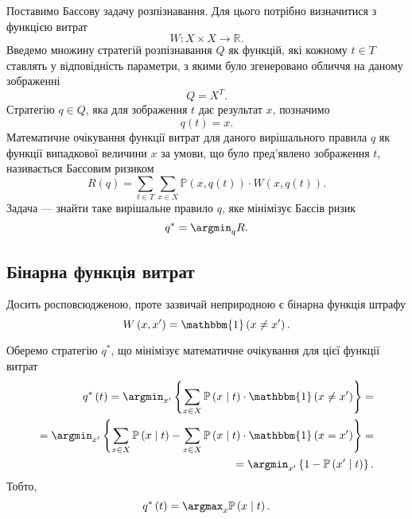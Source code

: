 Поставимо Баєсову задачу розпізнавання.
Для цього потрібно визначитися з функцією витрат
\cite{berger1980}
\begin{equation*}
  W: X \times X \rightarrow \mathbb{R}.
\end{equation*}
Введемо множину стратегій розпізнавання $Q$ як функцій,
які кожному $t \in T$ ставлять у відповідність параметри,
з якими було згенеровано обличчя на даному зображенні
\begin{equation*}
  Q = X^T.
\end{equation*}
Стратегію $q \in Q$, яка для зображення $t$ дає результат $x$, позначимо
\begin{equation*}
  q\left( t \right) = x.
\end{equation*}
Математичне очікування функції витрат для даного вирішального правила $q$
як функції випадкової величини $x$ за умови,
що було пред'явлено зображення $t$, називається Баєсовим ризиком
\begin{equation*}
  R \left( q \right)
  = \sum\limits_{t \in T} \sum\limits_{x \in X}
    \mathbb{P} \left( x,  q\left( t \right) \right)
    \cdot W \left( x, q\left( t \right) \right).
\end{equation*}
Задача --- знайти таке вирішальне правило $q$, яке мінімізує Баєсів ризик
\begin{equation*}
  q^* = \argmin_q R.
\end{equation*}

\subsection{Бінарна функція витрат}

Досить росповсюдженою, проте зазвичай неприродною є бінарна функція штрафу
\begin{equation*}
  W \left( x, x' \right)
  = \mathbbm{1} \left( x \neq x' \right).
\end{equation*}

Оберемо стратегію $q^*$,
що мінімізує математичне очікування для цієї функції витрат
\begin{equation*}
  \begin{split}
    q^* \left( t \right)
    = \argmin_{x'} \left\{
      \sum\limits_{x \in X}
        \mathbb{P} \left( x \;\middle|\;  t \right)
        \cdot \mathbbm{1} \left( x \neq x' \right)
      \right\} = \\
    = \argmin_{x'} \left\{
      \sum\limits_{x \in X}
        \mathbb{P} \left( x \;\middle|\;  t \right)
      - \sum\limits_{x \in X}
        \mathbb{P} \left( x \;\middle|\;  t \right)
        \cdot \mathbbm{1} \left( x = x' \right)
      \right\} = \\
    = \argmin_{x'} \left\{
      1 - \mathbb{P} \left( x' \;\middle|\;  t \right)
      \right\}.
  \end{split}
\end{equation*}
Тобто,
\begin{equation*}
  q^* \left( t \right)
  = \argmax_x \mathbb{P} \left( x \;\middle|\;  t \right).
\end{equation*}

